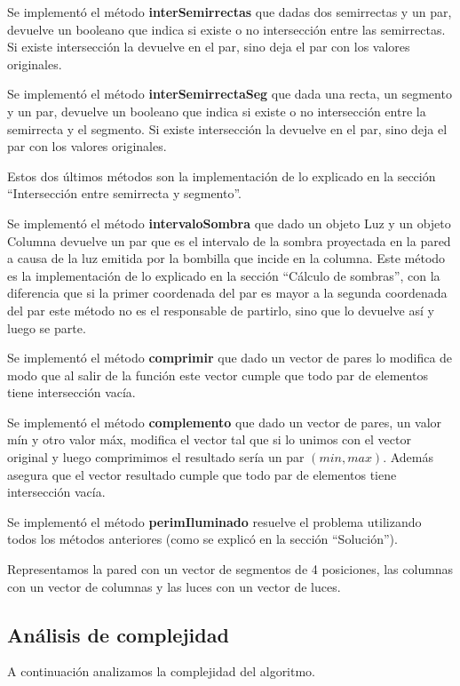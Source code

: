 Se implementó el método \textbf{interSemirrectas} que dadas dos semirrectas y un par, devuelve un
booleano que indica si existe o no intersección entre las semirrectas. Si existe intersección la
devuelve en el par, sino deja el par con los valores originales.

Se implementó el método \textbf{interSemirrectaSeg} que dada una recta, un segmento y un par,
devuelve un booleano que indica si existe o no intersección entre la semirrecta y el segmento.
Si existe intersección la devuelve en el par, sino deja el par con los valores originales.

Estos dos últimos métodos son la implementación de lo explicado en la sección ``Intersección entre
semirrecta y segmento''.

Se implementó el método \textbf{intervaloSombra} que dado un objeto Luz y un objeto Columna devuelve
un par que es el intervalo de la sombra proyectada en la pared a causa de la luz emitida por la
bombilla que incide en la columna. Este método es la implementación de lo explicado en la sección
``Cálculo de sombras'', con la diferencia que si la primer coordenada del par es mayor a la segunda
coordenada del par este método no es el responsable de partirlo, sino que lo devuelve así y luego
se parte.

Se implementó el método \textbf{comprimir} que dado un vector de pares lo modifica de modo que
al salir de la función este vector cumple que todo par de elementos tiene intersección vacía.

Se implementó el método \textbf{complemento} que dado un vector de pares, un valor mín y otro valor
máx, modifica el vector tal que si lo unimos con el vector original y luego comprimimos el
resultado sería un par $(min, max)$. Además asegura que el vector resultado cumple que todo par de
elementos tiene intersección vacía.

Se implementó el método \textbf{perimIluminado} resuelve el problema utilizando todos los métodos
anteriores (como se explicó en la sección ``Solución'').

Representamos la pared con un vector de segmentos de 4 posiciones, las columnas con un vector de 
columnas y las luces con un vector de luces.

\subsection*{Análisis de complejidad}

A continuación analizamos la complejidad del algoritmo.

